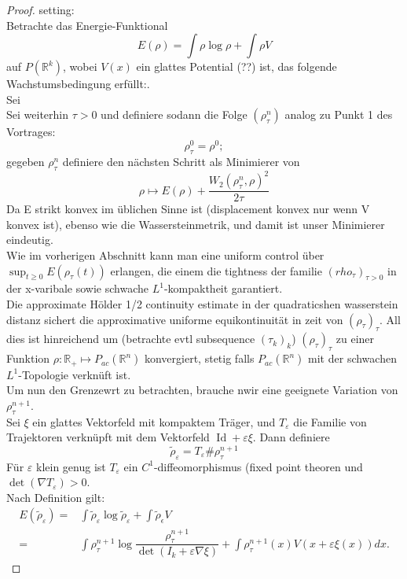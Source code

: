 \documentclass[11pt,a4paper,notitlepage]{scrreprt}
\newcommand{\RR}{\mathbb{R}}
\begin{document}
\begin{proof}
setting: \\
Betrachte das Energie-Funktional \[E(\rho)=\int \rho \log \rho + \int\rho V\] auf $P(\RR^k)$, wobei $V(x)$ ein glattes Potential (??) ist, das folgende Wachstumsbedingung erfüllt:.\\
Sei \\
Sei weiterhin $\tau>0$ und definiere sodann die Folge $(\rho_\tau^n)$ analog zu Punkt 1 des Vortrages:\\

\[\rho_\tau^0=\rho^0; \]
gegeben $\rho_\tau^n$ definiere den nächsten Schritt als Minimierer von
\begin{equation*} \rho \mapsto E(\rho)+\dfrac{W_2(\rho_\tau^n,\rho)^2}{2\tau}
\end{equation*}
Da E strikt konvex im üblichen Sinne ist (displacement konvex nur wenn V konvex ist), ebenso wie die Wassersteinmetrik, und damit ist unser Minimierer eindeutig. \\
Wie im vorherigen Abschnitt kann man eine uniform control über $\sup_{t\geq 0} E(\rho_\tau(t))$ erlangen, die einem die tightness der familie $(rho_\tau)_{\tau >0}$ in der x-varibale sowie schwache $L^1$-kompaktheit garantiert. \\
Die approximate Hölder 1/2 continuity estimate in der quadraticshen wasserstein distanz sichert die approximative uniforme equikontinuität in zeit von $(\rho_\tau)_\tau$. All dies ist hinreichend um (betrachte evtl subsequence $(\tau_k)_k$) $(\rho_\tau)_\tau$ zu einer Funktion $\rho: \RR_+ \mapsto P_{ac}(\RR^n)$ konvergiert, stetig falls $P_{ac}(\RR^n)$ mit der schwachen $L^1$-Topologie verknüft ist. \\
Um nun den Grenzewrt zu betrachten, brauche nwir eine geeignete Variation von $\rho_\tau^{n+1}$.\\
Sei $\xi$ ein glattes Vektorfeld mit kompaktem Träger, und $T_\varepsilon$ die Familie von Trajektoren verknüpft mit dem Vektorfeld $\operatorname{Id} +\varepsilon\xi$. Dann definiere
\[\tilde{\rho}_\varepsilon=T_\varepsilon \#\rho_\tau^{n+1} \]
Für $\varepsilon$ klein genug ist $T_\varepsilon$ ein $C^1$-diffeomorphismus (fixed point theoren und $\det(\nabla T_\varepsilon)>0$.\\
Nach Definition gilt:
\begin{eqnarray}
E(\tilde{\rho}_\varepsilon)=&\int\tilde{\rho}_\varepsilon\log\tilde{\rho}_\varepsilon+\int\tilde{\rho}_\epsilon V\\
=&\int \rho_\tau^{n+1}\log\dfrac{\rho_\tau^{n+1}}{\det(I_k+\varepsilon \nabla \xi)}+\int \rho_\tau^{n+1}(x)V(x+\varepsilon\xi(x))dx.

\end{eqnarray}
\end{proof}
\end{document}
